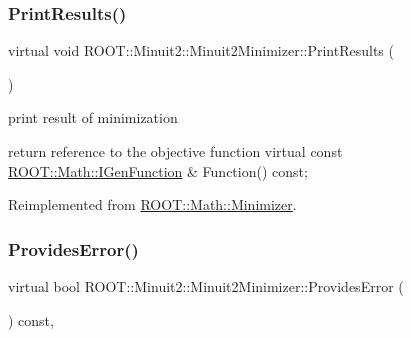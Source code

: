 \mbox{\label{classROOT_1_1Minuit2_1_1Minuit2Minimizer_a0caadc2005eac5d87fc7345bd54decf0}} 
\subsubsection{\texorpdfstring{PrintResults()}{PrintResults()}\hspace{0.1cm}{\footnotesize\ttfamily [2/2]}}
{\footnotesize\ttfamily virtual void R\+O\+O\+T\+::\+Minuit2\+::\+Minuit2\+Minimizer\+::\+Print\+Results (\begin{DoxyParamCaption}{ }\end{DoxyParamCaption})\hspace{0.3cm}{\ttfamily [virtual]}}



print result of minimization 

return reference to the objective function virtual const \mbox{\hyperlink{namespaceROOT_1_1Math_afe6400b4439b79d54c41fb9f5c5af171}{R\+O\+O\+T\+::\+Math\+::\+I\+Gen\+Function}} \& Function() const; 

Reimplemented from \mbox{\hyperlink{classROOT_1_1Math_1_1Minimizer_aea1c5d69c6a1c1f2cf4d17a523862560}{R\+O\+O\+T\+::\+Math\+::\+Minimizer}}.

\mbox{\label{classROOT_1_1Minuit2_1_1Minuit2Minimizer_a3a3a8abea38285fe639f2f0ec5505533}} 
\subsubsection{\texorpdfstring{ProvidesError()}{ProvidesError()}\hspace{0.1cm}{\footnotesize\ttfamily [1/2]}}
{\footnotesize\ttfamily virtual bool R\+O\+O\+T\+::\+Minuit2\+::\+Minuit2\+Minimizer\+::\+Provides\+Error (\begin{DoxyParamCaption}{ }\end{DoxyParamCaption}) const\hspace{0.3cm}{\ttfamily [inline]}, {\ttfamily [virtual]}}



